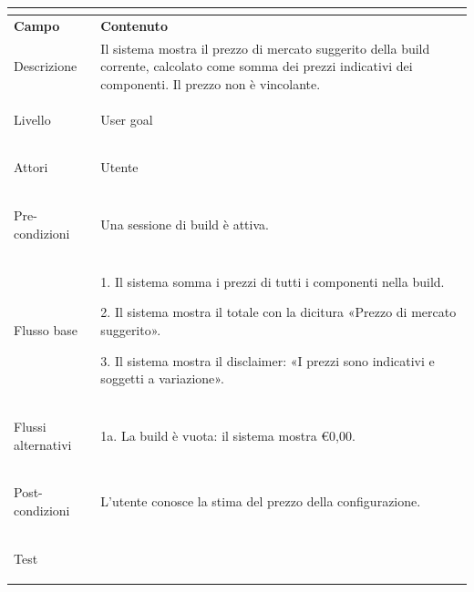 \documentclass[11pt, a4paper]{article}
\begin{document}
\vspace{10pt}




\noindent

\begin{tabularx}{\textwidth}{|>{\bfseries}p{3.8cm}|X|}

\hline

\multicolumn{2}{|l|}{\textbf{UC8 --- Visualizza prezzo}} \\

\hline

Campo & \textbf{Contenuto} \\

\hline

Descrizione & Il sistema mostra il prezzo di mercato suggerito della build corrente, calcolato come somma dei prezzi indicativi dei componenti. Il prezzo non è vincolante. \\

\hline

Livello & User goal \\

\hline

Attori & Utente \\

\hline

Pre-condizioni & Una sessione di build è attiva. \\

\hline

Flusso base & 

1. Il sistema somma i prezzi di tutti i componenti nella build.\newline

2. Il sistema mostra il totale con la dicitura «Prezzo di mercato suggerito».\newline

3. Il sistema mostra il disclaimer: «I prezzi sono indicativi e soggetti a variazione». \\

\hline

Flussi alternativi & 1a. La build è vuota: il sistema mostra €0,00. \\

\hline

Post-condizioni & L'utente conosce la stima del prezzo della configurazione. \\

\hline

Test & \\

\hline

\end{tabularx}
\end{document}
